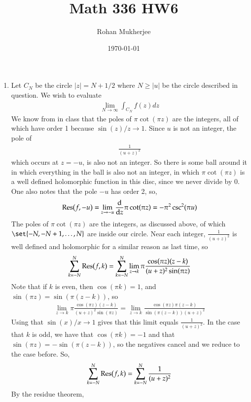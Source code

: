 \documentclass[12pt]{article}
\title{Math 336 HW6}
\date{\today}
\author{Rohan Mukherjee}
\theoremstyle{definitionstyle}
\begin{document}
	\maketitle
	\begin{enumerate}[leftmargin=\labelsep]
		\item Let $C_N$ be the circle $|z| = N + 1/2$ where $N \geq |u|$ be the circle described in question. We wish to evaluate
		\begin{align*}
			\lim_{N \to \infty} \int_{C_N} f(z)dz
		\end{align*}
		We know from in class that the poles of $\pi \cot(\pi z)$ are the integers, all of which have order 1 because $\sin(z) / z \to 1$. Since $u$ is not an integer, the pole of
		\begin{align*}
			\frac{1}{(u+z)^2}
		\end{align*}
		which occurs at $z = -u$, is also not an integer. So there is some ball around it in which everything in the ball is also not an integer, in which $\pi\cot(\pi z)$ is a well defined holomorphic function in this disc, since we never divide by 0. One also notes that the pole $-u$ has order 2, so, 
		\begin{align*}
			\Res(f, -u) = \lim_{z \to -u} \dv{z} \pi\cot(\pi z) = -\pi^2 \csc^2(\pi u)
		\end{align*}
		The poles of $\pi \cot(\pi z)$ are the integers, as discussed above, of which $\set{-N, -N + 1, \ldots, N}$ are inside our circle. Near each integer, $\frac{1}{(u+z)^2}$ is well defined and holomorphic for a similar reason as last time, so
		\begin{align*}
			\sum_{k=-N}^{N} \Res(f, k) = \sum_{k=-N}^{N} \lim_{z \to k} \pi \frac{\cos(\pi z)(z-k)}{(u+z)^2 \sin(\pi z)}
		\end{align*}
		Note that if $k$ is even, then $\cos(\pi k) = 1$, and $\sin(\pi z) = \sin(\pi (z-k))$, so 
		\begin{align*}
			\lim_{z \to k} \pi \frac{\cos(\pi z)(z-k)}{(u+z)^2 \sin(\pi z)} = \lim_{z \to k}\frac{\cos(\pi z)\pi(z-k)}{\sin(\pi(z-k))(u+z)^2}
		\end{align*}
		Using that $\sin(x) / x \to 1$ gives that this limit equals $\frac{1}{(u+z)^2}$. In the case that $k$ is odd, we have that $\cos(\pi k) = -1$ and that $\sin(\pi z) = -\sin(\pi (z-k))$, so the negatives cancel and we reduce to the case before. So,
		\begin{align*}
			\sum_{k=-N}^{N} \Res(f, k) = \sum_{k=-N}^{N} \frac{1}{(u+z)^2}
		\end{align*}
		By the residue theorem,

\end{enumerate}
\end{document}
